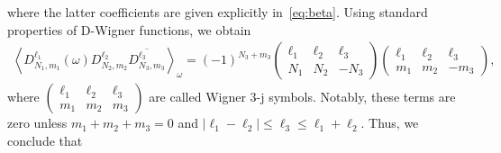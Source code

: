 \documentclass[12pt]{article}
\newcommand{\1}{\mathbf{1}}
\newcommand{\tamir}{x}
\theoremstyle{plain}
\theoremstyle{definition}
\theoremstyle{remark}
\theoremstyle{plain}
\theoremstyle{remark}
\theoremstyle{plain}
\theoremstyle{plain}
\begin{document}
where the latter coefficients are given explicitly in~\eqref{eq:beta}. Using standard properties of D-Wigner functions, we obtain  
\begin{align*}
\left\langle D_{N_1,m_1}^{\ell_1}(\omega)D_{N_2,m_2}^{\ell_2}\overline{D_{N_3,m_3}^{\ell_3}}\right\rangle_{\omega} = (-1)^{N_3+m_3} \left(\begin{array}{ccc}\ell_1 & \ell_2  & \ell_3\\ N_1 & N_2 & -N_3\end{array}\right)\left(\begin{array}{ccc}\ell_1 & \ell_2  & \ell_3\\ m_1 & m_2 & -m_3\end{array}\right),
\end{align*}
where  $\left(\begin{array}{ccc} \ell_1 & \ell_2 & \ell_3\\ m_1 & m_2 & m_3\end{array}\right)$ are called Wigner 3-j symbols. 
Notably, these terms are zero unless $m_1+m_2+m_3=0$ and $|\ell_1-\ell_2|\leq \ell_3\leq \ell_1+\ell_2$. Thus,  we conclude that 
\end{document}
